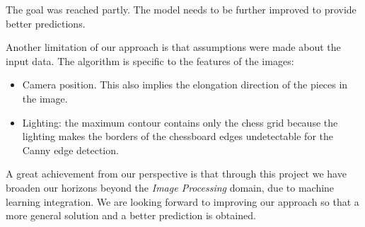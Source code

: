 \documentclass[conference]{IEEEtran}
\begin{document}
The goal was reached partly. The model needs to be further improved to provide better predictions.

Another limitation of our approach is that assumptions were made about the input data. The algorithm is specific to the features of the images:

\begin{itemize}
    \item Camera position. This also implies the elongation direction of the pieces in the image.
    \item Lighting: the maximum contour contains only the chess grid because the lighting makes the borders of the chessboard edges undetectable for the Canny edge detection. 
\end{itemize}

A great achievement from our perspective is that through this project we have broaden our horizons beyond the \emph{Image Processing} domain, due to machine learning integration.
We are looking forward to improving our approach so that a more general solution and a better prediction is obtained.





%
%
%

\nocite{*}

{\small
	
	
}








\end{document}
